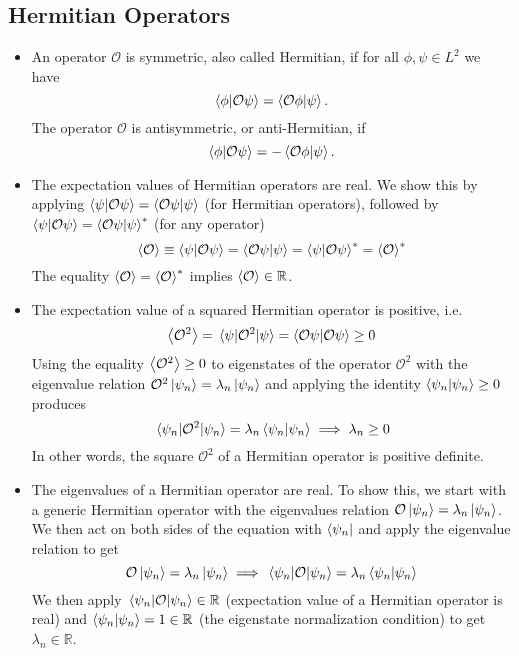 \documentclass[11pt, a4paper]{article}
\newcommand{\Herm}{Hermitian\xspace}
\renewcommand{\O}{\mathcal{O}}  %
\newcommand{\p}{\psi}  %
\begin{document}
\subsection{Hermitian Operators}
\begin{itemize}
	\item An operator $ \O $ is symmetric, also called Hermitian, if for all $ \phi, \psi \in L^{2} $ we have
	\begin{equation*}
		\braket{\phi}{\O \p} = \braket{\O\phi}{\p}.
	\end{equation*}
	The operator $ \O $ is antisymmetric, or anti-Hermitian, if
	\begin{equation*}
		\braket{\phi}{\O \p} = - \braket{\O \phi}{\p}.
	\end{equation*}
	
	\item The expectation values of Hermitian operators are real. We show this by applying $ \braket{\p}{\O \p} = \braket{\O \p}{\p} $ (for \Herm operators), followed by $ \braket{\p}{\O \p} = \braket{\O \p}{\p}^{*} $  (for any operator)
	\begin{equation*}
		\ev{\O} \equiv \braket{\psi}{\O \psi} = \braket{\O \psi}{\psi} = 		\braket{\psi}{\O \psi}^{*} = \ev{\O}^{*}
	\end{equation*}
	The equality $ \ev{\O} = \ev{\O}^{*} $ implies $ \ev{\O} \in \mathbb{R} $. 
	
	\item The expectation value of a squared \Herm operator is positive, i.e.
	\begin{equation*}
		\ev{\O^{2}} = \mel{\p}{\O^{2}}{\p} = \braket{\O \p}{\O \p}\geq 0
	\end{equation*}
	Using the equality $ \ev{\O^{2}} \geq 0 $ to eigenstates of the operator $ \O^{2} $ with the eigenvalue relation $ \O^{2} \ket{\psi_{n}} = \lambda_{n} \ket{\psi_{n}} $ and applying the identity $ \braket{\p_{n}}{\p_{n}} \geq 0 $ produces
	\begin{equation*}
		\mel{\p_{n}}{\O^{2}}{\p_{n}} = \lambda_{n}\braket{\psi_{n}}{\p_{n}} \implies \lambda_{n} \geq 0
	\end{equation*}
	In other words, the square $ \O^{2} $ of a \Herm operator is positive definite.
	
	\item The eigenvalues of a \Herm operator are real. To show this, we start with a generic \Herm operator with the eigenvalues relation $  \O \ket{\psi_{n}} = \lambda_{n} \ket{\psi_{n}} $. We then act on both sides of the equation with $ \bra{\p_{n}} $ and apply the eigenvalue relation to get
	\begin{equation*}
		\O \ket{\p_{n}} = \lambda_{n} \ket{\p_{n}} \implies \mel{\p_{n}}{\O}{\p_{n}} = \lambda_{n} \braket{\p_{n}}{\p_{n}}
	\end{equation*}
	We then apply $ \mel{\p_{n}}{\O}{\p_{n}} \in \mathbb{R} $ (expectation value of a \Herm operator is real) and $ \braket{\p_{n}}{\p_{n}} = 1 \in \mathbb{R} $ (the eigenstate normalization condition) to get $ \lambda_{n} \in \mathbb{R} $. 
	

\end{itemize}
\end{document}
